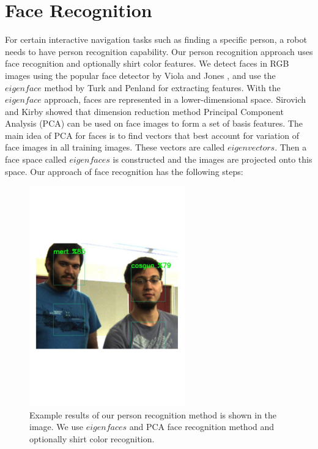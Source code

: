 \section{Face Recognition}
\label{sec:multimodal_face_recognition}

For certain interactive navigation tasks such as finding a specific person, a robot needs to have person recognition capability. Our person recognition approach uses face recognition and optionally shirt color features. We detect faces in RGB images using the popular face detector by Viola and Jones \cite{viola2004robust}, and use the $eigenface$ method by Turk and Penland \cite{turk1991face} for extracting features. With the $eigenface$ approach, faces are represented in a lower-dimensional space. Sirovich and Kirby \cite{sirovich1987low} showed that dimension reduction method Principal Component Analysis (PCA) can be used on face images to form a set of basis features. The main idea of PCA for faces is to find vectors that best account for variation of face images in all training images. These vectors are called $eigenvectors$. Then a face space called $eigenfaces$ is constructed and the images are projected onto this space. Our approach of face recognition has the following steps:

\begin{figure}[ht!]
\centering
\includegraphics[width=0.6\textwidth]{pics/person_recognition}
\caption{Example results of our person recognition method is shown in the image. We use $eigenfaces$ and PCA face recognition method and optionally shirt color recognition.}
\label{fig:person_recognition}
\end{figure}

